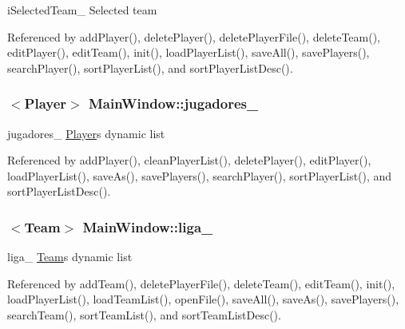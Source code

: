 i\+Selected\+Team\+\_\+ Selected team 



Referenced by add\+Player(), delete\+Player(), delete\+Player\+File(), delete\+Team(), edit\+Player(), edit\+Team(), init(), load\+Player\+List(), save\+All(), save\+Players(), search\+Player(), sort\+Player\+List(), and sort\+Player\+List\+Desc().

\hypertarget{class_main_window_aa0bb31955571995d85c4d9fda8bc9bbb}{}
\subsubsection[{jugadores\+\_\+}]{$<${\bf Player}$>$ Main\+Window\+::jugadores\+\_\+\hspace{0.3cm}{\ttfamily [private]}}\label{class_main_window_aa0bb31955571995d85c4d9fda8bc9bbb}


jugadores\+\_\+ \hyperlink{class_player}{Player}\textquotesingle{}s dynamic list 



Referenced by add\+Player(), clean\+Player\+List(), delete\+Player(), edit\+Player(), load\+Player\+List(), save\+As(), save\+Players(), search\+Player(), sort\+Player\+List(), and sort\+Player\+List\+Desc().

\hypertarget{class_main_window_a5358b34e5fbb97d75dc06c61e7ae50fb}{}
\subsubsection[{liga\+\_\+}]{$<${\bf Team}$>$ Main\+Window\+::liga\+\_\+\hspace{0.3cm}{\ttfamily [private]}}\label{class_main_window_a5358b34e5fbb97d75dc06c61e7ae50fb}


liga\+\_\+ \hyperlink{class_team}{Team}\textquotesingle{}s dynamic list 



Referenced by add\+Team(), delete\+Player\+File(), delete\+Team(), edit\+Team(), init(), load\+Player\+List(), load\+Team\+List(), open\+File(), save\+All(), save\+As(), save\+Players(), search\+Team(), sort\+Team\+List(), and sort\+Team\+List\+Desc().

\hypertarget{class_main_window_accae73696fc981f52f13a1e51b411ccb}{}
